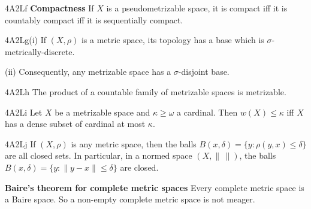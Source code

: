 \spheader 4A2Lf {\bf Compactness} If $X$ is a pseudometrizable space,
it is compact iff it is countably compact iff it is sequentially
compact.

\spheader 4A2Lg(i) If $(X,\rho)$ is a metric space, its topology has a
base which is $\sigma$-metrically-discrete.

\quad (ii) Consequently, any metrizable space has a
$\sigma$-disjoint base.

\spheader 4A2Lh The product of a countable family of metrizable spaces
is metrizable.

\spheader 4A2Li Let $X$ be a metrizable space and $\kappa\ge\omega$ a
cardinal.   Then $w(X)\le\kappa$ iff $X$ has a dense subset of cardinal
at most $\kappa$.

\spheader 4A2Lj If $(X,\rho)$ is any metric space, then the balls
$B(x,\delta)=\{y:\rho(y,x)\le\delta\}$ are all closed
sets.
In particular, in a normed space $(X,\|\,\|)$, the balls
$B(x,\delta)=\{y:\|y-x\|\le\delta\}$ are closed.

{\bf Baire's theorem for complete metric spaces} Every
complete metric space is a Baire space.
So a non-empty complete metric space is not
meager.

